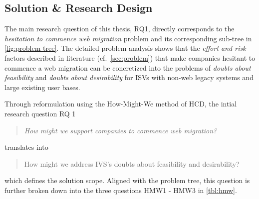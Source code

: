 \hypertarget{solution-research-design}{%
\subsection{Solution \& Research Design}\label{solution-research-design}}

The main research question of this thesis, RQ1, directly corresponds to the \emph{hesitation to commence web migration} problem and its corresponding sub-tree in \cref{fig:problem-tree}.
The detailed problem analysis shows that the \emph{effort and risk} factors described in literature (cf.~\cref{sec:problem}) that make companies hesitant to commence a web migration can be concretized into the problems of \emph{doubts about feasibility} and \emph{doubts about desirability} for ISVs with non-web legacy systems and large existing user bases.

Through reformulation using the How-Might-We method of HCD, the intial research question RQ 1

\begin{quote}
\emph{How might we support companies to commence web migration?}
\end{quote}

translates into

\begin{quote}
How might we address IVS's doubts about feasibility and desirability?
\end{quote}

which defines the solution scope.
Aligned with the problem tree, this question is further broken down into the three questions HMW1 - HMW3 in \cref{tbl:hmw}.

